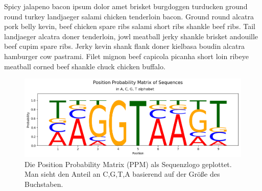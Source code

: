 % 



\pagebreak
\bigskip\noindent
Spicy jalapeno bacon ipsum dolor amet brisket burgdoggen turducken ground round turkey landjaeger salami chicken tenderloin bacon. Ground round alcatra pork belly kevin, beef chicken spare ribs salami short ribs shankle beef ribs. Tail landjaeger alcatra doner tenderloin, jowl meatball jerky shankle brisket andouille beef cupim spare ribs. Jerky kevin shank flank doner kielbasa boudin alcatra hamburger cow pastrami. Filet mignon beef capicola picanha short loin ribeye meatball corned beef shankle chuck chicken buffalo.

\begin{figure}[h]
	\begin{center}
		\includegraphics[scale=0.5]{../pss/pss_ppm.png}	
	\end{center}
	\caption{Die Position Probability Matrix (PPM) als Sequenzlogo geplottet. Man sieht den Anteil an C,G,T,A basierend auf der
	Größe des Buchstaben.}
\end{figure}

